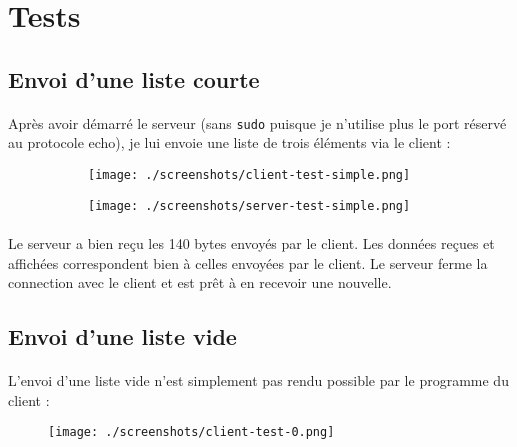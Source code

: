 \documentclass{article}
\begin{document}
    \newpage
    \section{Tests}
    \subsection{Envoi d'une liste courte}
    \paragraph{}
    Après avoir démarré le serveur (sans \texttt{sudo} puisque je n'utilise plus le port réservé au protocole echo), je lui envoie une liste de trois éléments via le client :
    \begin{figure}[H]
        \centering
        \begin{subfigure}[b]{.48\textwidth}
            \centering
            \texttt{[image: ./screenshots/client-test-simple.png]}
        \end{subfigure}
        \begin{subfigure}[b]{.48\textwidth}
            \centering
            \texttt{[image: ./screenshots/server-test-simple.png]}
        \end{subfigure}
    \end{figure}

    \paragraph{}
    Le serveur a bien reçu les 140 bytes envoyés par le client. Les données reçues et affichées correspondent bien à celles envoyées par le client. Le serveur ferme la connection avec le client et est prêt à en recevoir une nouvelle.

    \subsection{Envoi d'une liste vide}
    \paragraph{}
    L'envoi d'une liste vide n'est simplement pas rendu possible par le programme du client :
    \begin{figure}[H]
        \centering
        \texttt{[image: ./screenshots/client-test-0.png]}
    \end{figure}
\end{document}
